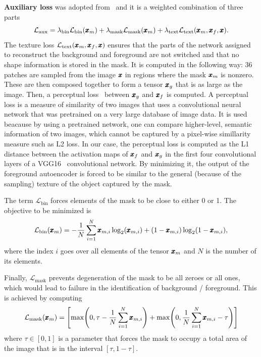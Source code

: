 \textbf{Auxiliary loss} was adopted from~\cite{sauer2021counterfactual} and it is a weighted combination of three parts
\begin{equation} \label{eq:auxloss}
    \mathcal{L}_{\text{aux}} = \lambda_{\text{bin}}\mathcal{L}_{\text{bin}}(\pmb{{x}}_m) + \lambda_{\text{mask}}\mathcal{L}_{\text{mask}}(\pmb{{x}}_m) + \lambda_{\text{text}}\mathcal{L}_{\text{text}}(\pmb{{x}}_m,\pmb{{x}}_f,\pmb{{x}}).
\end{equation} 
The texture loss $\mathcal{L}_{\text{text}}(\pmb{{x}}_m,\pmb{{x}}_f,\pmb{{x}})$ ensures that the parts of the network assigned to reconstruct the background and foreground are not switched and that no shape information is stored in the mask. It is computed in the following way: 36 patches are sampled from the image $\pmb{{x}}$ in regions where the mask $\pmb{{x}}_m$ is nonzero. These are then composed together to form a tensor $\pmb{{x}}_g$ that is as large as the image. Then, a perceptual loss~\cite{johnson2016perceptual} between $\pmb{{x}}_g$ and $\pmb{{x}}_f$ is computed. A perceptual loss is a measure of similarity of two images that uses a convolutional neural network that was pretrained on a very large database of image data. It is used beacause by using a pretrained network, one can compare higher-level, semantic information of two images, which cannot be captured by a pixel-wise simillarity measure such as L2 loss. In our case, the perceptual loss is computed as the L1 distance between the activation maps of $\pmb{{x}}_f$ and $\pmb{{x}}_g$ in the first four convolutional layers of a VGG16~\cite{simonyan2014very} convolutional network. By minimizing it, the output of the foreground autoencoder is forced to be similar to the general (because of the sampling) texture of the object captured by the mask.

The term $\mathcal{L}_{\text{bin}}$ forces elements of the mask to be close to either 0 or 1. The objective to be minimized is
\begin{equation}
    \mathcal{L}_{\text{bin}}(\pmb{{x}}_m) = - \frac{1}{N} \sum_{i=1}^N \pmb{{x}}_{m,i} \log_2(\pmb{{x}}_{m,i}) + (1-\pmb{{x}}_{m,i}) \log_2(1 - \pmb{{x}}_{m,i}),
\end{equation}
where the index $i$ goes over all elements of the tensor $\pmb{{x}}_m$ and $N$ is the number of its elements.

 Finally, $\mathcal{L}_{\text{mask}}$ prevents degeneration of the mask to be all zeroes or all ones, which would lead to failure in the identification of background / foreground. This is achieved by computing
  \begin{equation}
    \mathcal{L}_{\text{mask}}(\vc{x}_m) = \left[ \max \left( 0, \tau - \frac{1}{N} \sum_{i=1}^N \vc{x}_{m,i} \right) + \max \left( 0, \frac{1}{N} \sum_{i=1}^N \vc{x}_{m,i} -\tau  \right) \right]
\end{equation}
where $\tau \in [0,1]$ is a parameter that forces the mask to occupy a total area of the image that is in the interval $[\tau, 1-\tau]$. 

